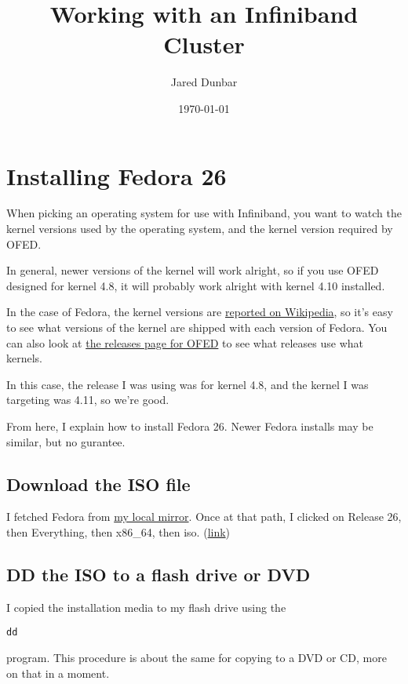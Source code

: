 \documentclass{article}
\begin{document}
\title{Working with an Infiniband Cluster}
\author{Jared Dunbar}
\date{\today}
\maketitle
\tableofcontents

\section{Installing Fedora 26}

When picking an operating system for use with Infiniband, you want to watch the kernel versions used by the operating system, and the kernel version required by OFED.

In general, newer versions of the kernel will work alright, so if you use OFED designed for kernel 4.8, it will probably work alright with kernel 4.10 installed.

In the case of Fedora, the kernel versions are \href{https://en.wikipedia.org/wiki/Fedora_(operating_system)#Releases}{reported on Wikipedia}, so it's easy to see what versions of the kernel are shipped with each version of Fedora. You can also look at \href{http://downloads.openfabrics.org/OFED/}{the releases page for OFED} to see what releases use what kernels.

In this case, the release I was using was for kernel 4.8, and the kernel I was targeting was 4.11, so we're good.

From here, I explain how to install Fedora 26. Newer Fedora installs may be similar, but no gurantee.

\subsection{Download the ISO file}

I fetched Fedora from \href{http://mirror.clarkson.edu/fedora/linux/releases/}{my local mirror}. Once at that path, I clicked on Release 26, then Everything, then x86\_64, then iso. (\href{http://mirror.clarkson.edu/fedora/linux/releases/26/Everything/x86_64/iso}{link})

\subsection{DD the ISO to a flash drive or DVD}

I copied the installation media to my flash drive using the \begin{verbatim}dd\end{verbatim} program. This procedure is about the same for copying to a DVD or CD, more on that in a moment.
\end{document}
